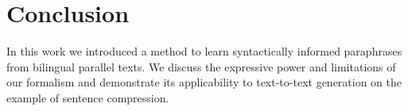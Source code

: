 \documentclass[11pt]{article}
\begin{document}
\section{Conclusion} \label{conclusion}

In this work we introduced a method to learn syntactically informed
paraphrases from bilingual parallel texts. We discuss the expressive
power and limitations of our formalism and demonstrate its
applicability to text-to-text generation on the example of sentence
compression.




\nocite{*}
\end{document}
